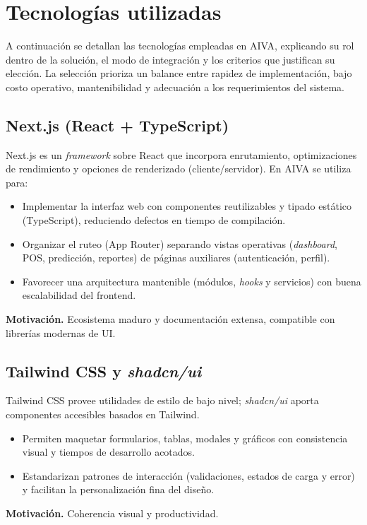 \vspace{1cm}

\section{Tecnologías utilizadas}\label{sec:tecnologias}
A continuación se detallan las tecnologías empleadas en AIVA, explicando su rol dentro de la solución, el modo de integración y los criterios que justifican su elección. La selección prioriza un balance entre rapidez de implementación, bajo costo operativo, mantenibilidad y adecuación a los requerimientos del sistema.

\subsection{Next.js (React + TypeScript)}
Next.js es un \textit{framework} sobre React que incorpora enrutamiento, optimizaciones de rendimiento y opciones de renderizado (cliente/servidor). En AIVA se utiliza para:
\begin{itemize}
    \item Implementar la interfaz web con componentes reutilizables y tipado estático (TypeScript), reduciendo defectos en tiempo de compilación.
    \item Organizar el ruteo (App Router) separando vistas operativas (\textit{dashboard}, POS, predicción, reportes) de páginas auxiliares (autenticación, perfil).
    \item Favorecer una arquitectura mantenible (módulos, \textit{hooks} y servicios) con buena escalabilidad del frontend.
\end{itemize}
\noindent\textbf{Motivación.} Ecosistema maduro y documentación extensa, compatible con librerías modernas de UI.

\subsection{Tailwind CSS y \textit{shadcn/ui}}
Tailwind CSS provee utilidades de estilo de bajo nivel; \textit{shadcn/ui} aporta componentes accesibles basados en Tailwind.
\begin{itemize}
    \item Permiten maquetar formularios, tablas, modales y gráficos con consistencia visual y tiempos de desarrollo acotados.
    \item Estandarizan patrones de interacción (validaciones, estados de carga y error) y facilitan la personalización fina del diseño.
\end{itemize}
\noindent\textbf{Motivación.} Coherencia visual y productividad. 

